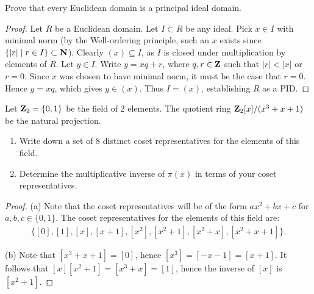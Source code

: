 \documentclass[11pt,twoside,openany]{memoir}
\begin{document}
\begin{problem}[F17, P3]
Prove that every Euclidean domain is a principal ideal domain.
\end{problem}
    {\color{blue} \begin{proof}
        Let $R$ be a Euclidean domain. Let $I \subset R$ be any ideal. Pick $x \in I$ with minimal norm (by the Well-ordering principle, such an $x$ exists since $\left\{\left|r\right| \mid r \in I\right\} \subset \mathbf{N}$). Clearly $(x) \subseteq I$, as $I$ is closed under multiplication by elements of $R$. Let $y \in I$. Write $y = xq + r$, where $q,r \in \mathbf{Z}$ such that $|r| < |x|$ or $r = 0$. Since $x$ was chosen to have minimal norm, it must be the case that $r = 0$. Hence $y = xq$, which gives $y \in (x)$. Thus $I = (x)$, establishing $R$ as a PID.
    \end{proof}}
\newpage
\begin{problem}[W22, P4]
    Let $\mathbf{Z}_2 = \{0,1\}$ be the field of 2 elements. The quotient ring $\mathbf{Z}_2[x]/(x^3 + x + 1)$ be the natural projection.
    \begin{enumerate}[label = (\alph*),itemsep=1pt,topsep=3pt]
        \item Write down a set of 8 distinct coset representatives for the elements of this field.
        \item Determine the multiplicative inverse of $\pi(x)$ in terms of your coset representatives.
    \end{enumerate}
\end{problem}
    {\color{blue} \begin{proof}
        (a) Note that the coset representatives will be of the form $ax^2 + bx+c$ for $a,b,c \in \{0,1\}$. The coset representatives for the elements of this field are:
            \begin{equation*}
            \begin{split}
                \bigl\{[0],[1],[x],[x+1],[x^2],[x^2+1],[x^2+x],[x^2+x+1]\bigr\}.
            \end{split}
            \end{equation*}

        (b) Note that $[x^3 + x + 1] = [0]$, hence $[x^3] = [-x-1] = [x+1]$. It follows that $[x][x^2 + 1] = [x^3 + x] = [1]$, hence the inverse of $[x]$ is $[x^2 + 1]$.
    \end{proof}}
 
\end{document}
